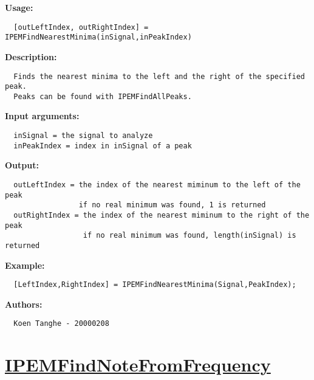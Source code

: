 \textbf{Usage:}
\begin{verbatim}  [outLeftIndex, outRightIndex] = IPEMFindNearestMinima(inSignal,inPeakIndex)

\end{verbatim}
\textbf{Description:}
\begin{verbatim}  Finds the nearest minima to the left and the right of the specified peak.
  Peaks can be found with IPEMFindAllPeaks.

\end{verbatim}
\textbf{Input arguments:}
\begin{verbatim}  inSignal = the signal to analyze
  inPeakIndex = index in inSignal of a peak

\end{verbatim}
\textbf{Output:}
\begin{verbatim}  outLeftIndex = the index of the nearest miminum to the left of the peak
                 if no real minimum was found, 1 is returned  
  outRightIndex = the index of the nearest miminum to the right of the peak
                  if no real minimum was found, length(inSignal) is returned

\end{verbatim}
\textbf{Example:}
\begin{verbatim}  [LeftIndex,RightIndex] = IPEMFindNearestMinima(Signal,PeakIndex);

\end{verbatim}
\textbf{Authors:}
\begin{verbatim}  Koen Tanghe - 20000208
\end{verbatim}


\newpage
\section*{\hyperlink{Concepts:IPEMFindNoteFromFrequency}{IPEMFindNoteFromFrequency}}
\hypertarget{FuncRef:IPEMFindNoteFromFrequency}{}

